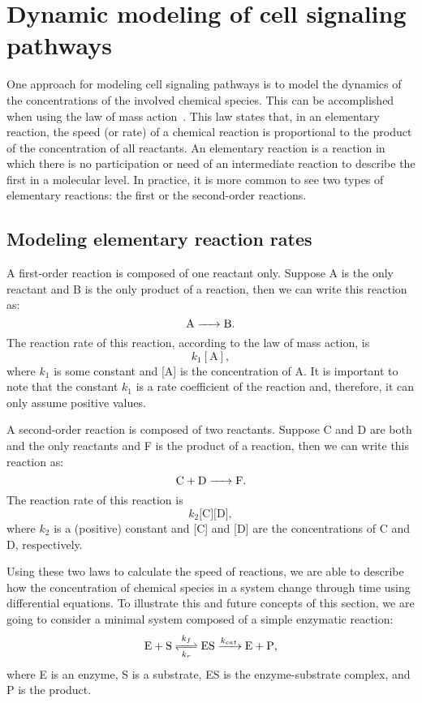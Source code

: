 \section{Dynamic modeling of cell signaling pathways}
One approach for modeling cell signaling pathways is to model the 
dynamics of the concentrations of the involved chemical species. This can be
accomplished when using the law of mass action~\cite{Voet2010}. This law 
states that, in an elementary reaction, the speed (or rate) of a 
chemical reaction is proportional to the product of the concentration of 
all reactants. An elementary reaction is a reaction in which there is no 
participation or need of an intermediate reaction to describe the first 
in a molecular level. In practice, it is more common to see two types of 
elementary reactions: the first or the second-order reactions. 

\subsection{Modeling elementary reaction rates}
A first-order reaction is composed of one reactant only. Suppose A is 
the only reactant and B is the only product of a reaction, then we can
write this reaction as:
\begin{equation*}
\ce{
    A -> B
}.
\end{equation*}
The reaction rate of this reaction, according to the law of mass 
action, is 
\begin{equation*}
    k_1[\text{A}],
\end{equation*}
where $k_1$ is some constant and [A] is the concentration of A. It is
important to note that the constant $k_1$ is a rate coefficient of the 
reaction and, therefore, it can only assume positive values.

A second-order reaction is composed of two reactants. Suppose C and D 
are both and the only reactants and F is the product of a reaction, then
we can write this reaction as:
\begin{equation*}
\ce{
    C + D -> F
}.
\end{equation*}
The reaction rate of this reaction is
\begin{equation*}
    k_2\text{[C][D]},
\end{equation*}
where $k_2$ is a (positive) constant and [C] and [D] are the 
concentrations of C and D, respectively.

Using these two laws to calculate the speed of reactions, we are able 
to describe how the concentration of chemical species in a system change 
through time using differential equations. To illustrate this and future 
concepts of this section, we are going to consider a minimal system 
composed of a simple enzymatic reaction:
\begin{equation}
\ce{
    E + S <=>[\ce{$k$_f}][\ce{$k$_r}] ES ->[\ce{$k_{cat}$}] E + P
},
\label{eq:simple_enzymatic}
\end{equation}
where E is an enzyme, S is a substrate, ES is the enzyme-substrate
complex, and P is the product.

